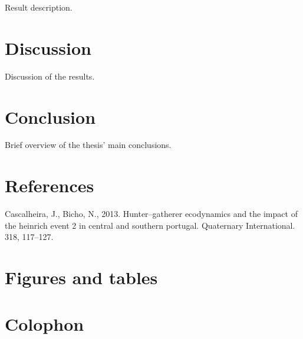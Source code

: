 \documentclass[12pt,twoside]{reedthesis}
\begin{document}
Result description.

\hypertarget{discussion}{%
\chapter{Discussion}\label{discussion}}

Discussion of the results.

\hypertarget{conclusion}{%
\chapter{Conclusion}\label{conclusion}}

Brief overview of the thesis' main conclusions.

\hypertarget{references}{%
\chapter*{References}\label{references}}


\noindent
\singlespacing

\setlength{\parindent}{-0.20in}
\setlength{\leftskip}{0.20in}
\setlength{\parskip}{8pt}

\hypertarget{refs}{}
\leavevmode\hypertarget{ref-cascalheiraandbicho2013}{}%
Cascalheira, J., Bicho, N., 2013. Hunter--gatherer ecodynamics and the impact of the heinrich event 2 in central and southern portugal. Quaternary International. 318, 117--127.

\appendix

\hypertarget{figures-and-tables}{%
\chapter{Figures and tables}\label{figures-and-tables}}

\hypertarget{colophon}{%
\chapter{Colophon}\label{colophon}}
\end{document}
